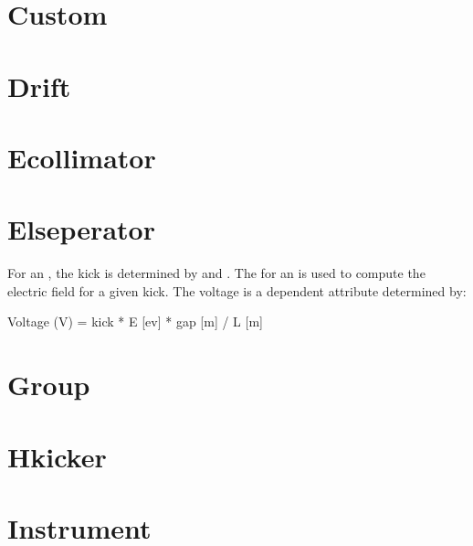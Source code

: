 \section{Custom}
\label{s:custom}

\section{Drift}
\label{s:drift}

\section{Ecollimator}
\label{s:ecol}

\section{Elseperator}
\label{s:elsep}

For an , the kick is determined by  and
. The  for an  is used to compute
the electric field for a given kick. The voltage is a dependent
attribute determined by:
\begin{example}
  Voltage (V) = kick * E [ev] * gap [m] / L [m] 
\end{example}

\section{Group}
\label{s:group}

\section{Hkicker}
\label{s:hk}

\section{Instrument}
\label{s:inst}

